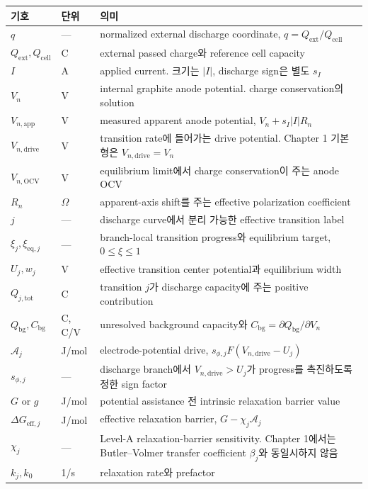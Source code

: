 \documentclass[11pt,a4paper]{article}
\newcommand{\eff}{\mathrm{eff}}
\newcommand{\eq}{\mathrm{eq}}
\newcommand{\app}{\mathrm{app}}
\newcommand{\drive}{\mathrm{drive}}
\newcommand{\bg}{\mathrm{bg}}
\newcommand{\cell}{\mathrm{cell}}
\newcommand{\ext}{\mathrm{ext}}
\newcommand{\OCV}{\mathrm{OCV}}
\newcommand{\tot}{\mathrm{tot}}
\begin{document}
\begin{longtable}{p{} p{} p{}}
\toprule 기호 & 단위 & 의미 \\ \midrule \endhead
$q$ & --- & normalized external discharge coordinate, $q=Q_{\ext}/Q_{\cell}$ \\
$Q_{\ext},Q_{\cell}$ & C & external passed charge와 reference cell capacity \\
$I$ & A & applied current. 크기는 $|I|$, discharge sign은 별도 $s_I$ \\
$V_n$ & V & internal graphite anode potential. charge conservation의 solution \\
$V_{n,\app}$ & V & measured apparent anode potential, $V_n+s_I|I|R_n$ \\
$V_{n,\drive}$ & V & transition rate에 들어가는 drive potential. Chapter 1 기본형은 $V_{n,\drive}=V_n$ \\
$V_{n,\OCV}$ & V & equilibrium limit에서 charge conservation이 주는 anode OCV \\
$R_n$ & $\Omega$ & apparent-axis shift를 주는 effective polarization coefficient \\
$j$ & --- & discharge curve에서 분리 가능한 effective transition label \\
$\xi_j,\xi_{\eq,j}$ & --- & branch-local transition progress와 equilibrium target, $0\le\xi\le1$ \\
$U_j,w_j$ & V & effective transition center potential과 equilibrium width \\
$Q_{j,\tot}$ & C & transition $j$가 discharge capacity에 주는 positive contribution \\
$Q_{\bg},C_{\bg}$ & C, C/V & unresolved background capacity와 $C_{\bg}=\partial Q_{\bg}/\partial V_n$ \\
$\mathcal A_j$ & J/mol & electrode-potential drive, $s_{\phi,j}F(V_{n,\drive}-U_j)$ \\
$s_{\phi,j}$ & --- & discharge branch에서 $V_{n,\drive}>U_j$가 progress를 촉진하도록 정한 sign factor \\
$G$ or $g$ & J/mol & potential assistance 전 intrinsic relaxation barrier value \\
$\Delta G_{\eff,j}$ & J/mol & effective relaxation barrier, $G-\chi_j\mathcal A_j$ \\
$\chi_j$ & --- & Level-A relaxation-barrier sensitivity. Chapter 1에서는 Butler--Volmer transfer coefficient $\beta_j$와 동일시하지 않음 \\
$k_j,k_0$ & 1/s & relaxation rate와 prefactor \\

\end{longtable}
\end{document}
